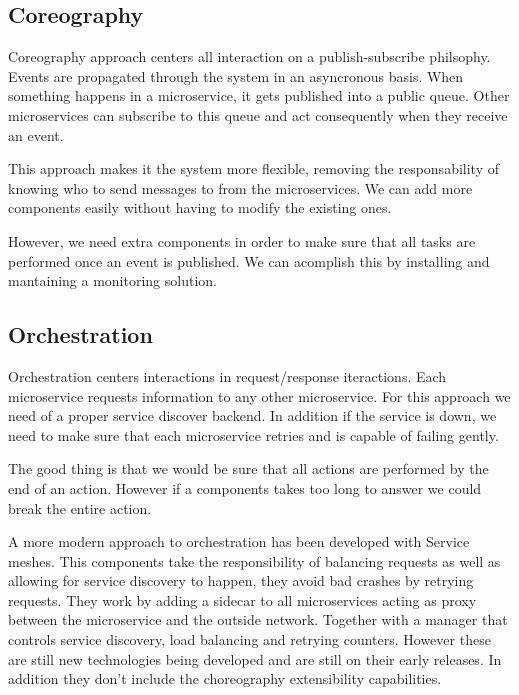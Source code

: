 \subsection{Coreography}

Coreography approach centers all interaction on a publish-subscribe philsophy. Events are propagated through the system in an asyncronous basis. When something happens in a microservice, it gets published into a public queue. Other microservices can subscribe to this queue and act consequently when they receive an event.
 
This approach makes it the system more flexible, removing the responsability of knowing who to send messages to from the microservices. We can add more components easily without having to modify the existing ones. 
 
However, we need extra components in order to make sure that all tasks are performed once an event is published. We can acomplish this by installing and mantaining a monitoring solution.


\subsection{Orchestration}

Orchestration centers interactions in request/response iteractions. Each microservice requests information to any other microservice. For this approach we need of a proper service discover backend. In addition if the service is down, we need to make sure that each microservice retries and is capable of failing gently. 
 
The good thing is that we would be sure that all actions are performed by the end of an action. However if a components takes too long to answer we could break the entire action.
 
A more modern approach to orchestration has been developed with Service meshes. This components take the responsibility of balancing requests as well as allowing for service discovery to happen, they avoid bad crashes by retrying requests. They work by adding a sidecar to all microservices acting as proxy between the microservice and the outside network. Together with a manager that controls service discovery, load balancing and retrying counters. However these are still new technologies being developed and are still on their early releases. In addition they don’t include the choreography extensibility capabilities.


